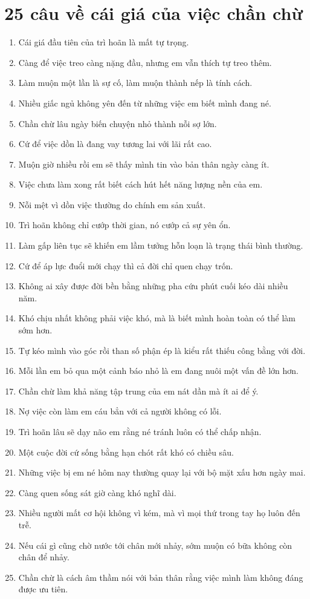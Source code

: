 \section{25 câu về cái giá của việc chần chừ}
\begin{enumerate}[leftmargin=*,resume]
\item Cái giá đầu tiên của trì hoãn là mất tự trọng.
\item Càng để việc treo càng nặng đầu, nhưng em vẫn thích tự treo thêm.
\item Làm muộn một lần là sự cố, làm muộn thành nếp là tính cách.
\item Nhiều giấc ngủ không yên đến từ những việc em biết mình đang né.
\item Chần chừ lâu ngày biến chuyện nhỏ thành nỗi sợ lớn.
\item Cứ để việc dồn là đang vay tương lai với lãi rất cao.
\item Muộn giờ nhiều rồi em sẽ thấy mình tin vào bản thân ngày càng ít.
\item Việc chưa làm xong rất biết cách hút hết năng lượng nền của em.
\item Nỗi mệt vì dồn việc thường do chính em sản xuất.
\item Trì hoãn không chỉ cướp thời gian, nó cướp cả sự yên ổn.
\item Làm gấp liên tục sẽ khiến em lầm tưởng hỗn loạn là trạng thái bình thường.
\item Cứ để áp lực đuổi mới chạy thì cả đời chỉ quen chạy trốn.
\item Không ai xây được đời bền bằng những pha cứu phút cuối kéo dài nhiều năm.
\item Khó chịu nhất không phải việc khó, mà là biết mình hoàn toàn có thể làm sớm hơn.
\item Tự kéo mình vào góc rồi than số phận ép là kiểu rất thiếu công bằng với đời.
\item Mỗi lần em bỏ qua một cảnh báo nhỏ là em đang nuôi một vấn đề lớn hơn.
\item Chần chừ làm khả năng tập trung của em nát dần mà ít ai để ý.
\item Nợ việc còn làm em cáu bẳn với cả người không có lỗi.
\item Trì hoãn lâu sẽ dạy não em rằng né tránh luôn có thể chấp nhận.
\item Một cuộc đời cứ sống bằng hạn chót rất khó có chiều sâu.
\item Những việc bị em né hôm nay thường quay lại với bộ mặt xấu hơn ngày mai.
\item Càng quen sống sát giờ càng khó nghĩ dài.
\item Nhiều người mất cơ hội không vì kém, mà vì mọi thứ trong tay họ luôn đến trễ.
\item Nếu cái gì cũng chờ nước tới chân mới nhảy, sớm muộn có bữa không còn chân để nhảy.
\item Chần chừ là cách âm thầm nói với bản thân rằng việc mình làm không đáng được ưu tiên.
\end{enumerate}

